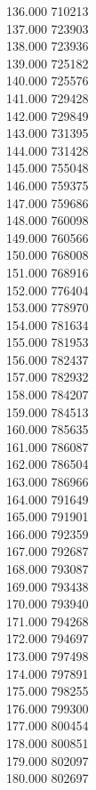 { 136.000	710213 \\
 137.000	723903 \\
 138.000	723936 \\
 139.000	725182 \\
 140.000	725576 \\
 141.000	729428 \\
 142.000	729849 \\
 143.000	731395 \\
 144.000	731428 \\
 145.000	755048 \\
 146.000	759375 \\
 147.000	759686 \\
 148.000	760098 \\
 149.000	760566 \\
 150.000	768008 \\
 151.000	768916 \\
 152.000	776404 \\
 153.000	778970 \\
 154.000	781634 \\
 155.000	781953 \\
 156.000	782437 \\
 157.000	782932 \\
 158.000	784207 \\
 159.000	784513 \\
 160.000	785635 \\
 161.000	786087 \\
 162.000	786504 \\
 163.000	786966 \\
 164.000	791649 \\
 165.000	791901 \\
 166.000	792359 \\
 167.000	792687 \\
 168.000	793087 \\
 169.000	793438 \\
 170.000	793940 \\
 171.000	794268 \\
 172.000	794697 \\
 173.000	797498 \\
 174.000	797891 \\
 175.000	798255 \\
 176.000	799300 \\
 177.000	800454 \\
 178.000	800851 \\
 179.000	802097 \\
 180.000	802697 \\
}
